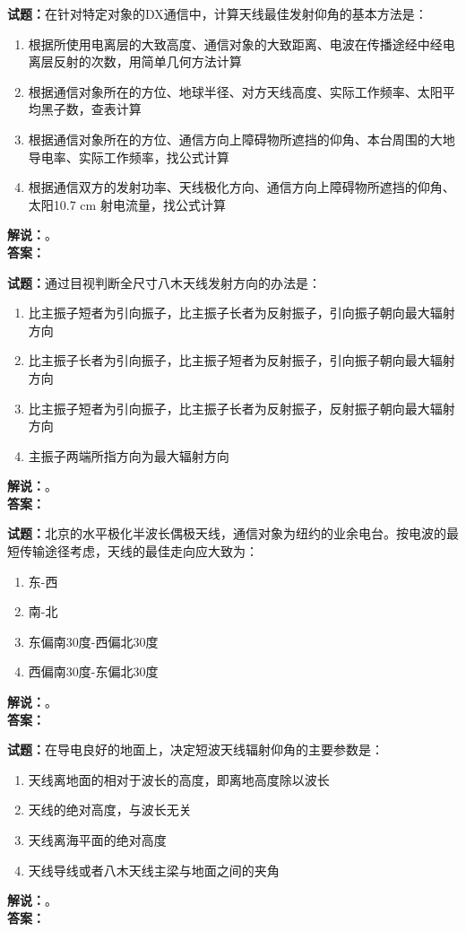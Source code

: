 \documentclass{ctexbook}
\begin{document}
\bigskip

\noindent\textbf{试题：}在针对特定对象的DX通信中，计算天线最佳发射仰角的基本方法是：
\begin{enumerate}[leftmargin=3em]
  \item 根据所使用电离层的大致高度、通信对象的大致距离、电波在传播途经中经电离层反射的次数，用简单几何方法计算
  \item 根据通信对象所在的方位、地球半径、对方天线高度、实际工作频率、太阳平均黑子数，查表计算
  \item 根据通信对象所在的方位、通信方向上障碍物所遮挡的仰角、本台周围的大地导电率、实际工作频率，找公式计算
  \item 根据通信双方的发射功率、天线极化方向、通信方向上障碍物所遮挡的仰角、太阳10.7 cm 射电流量，找公式计算
\end{enumerate}
\noindent\textbf{解说：}\textbf{}。\\\noindent\textbf{答案：}

\bigskip

\noindent\textbf{试题：}通过目视判断全尺寸八木天线发射方向的办法是：
\begin{enumerate}[leftmargin=3em]
  \item 比主振子短者为引向振子，比主振子长者为反射振子，引向振子朝向最大辐射方向
  \item 比主振子长者为引向振子，比主振子短者为反射振子，引向振子朝向最大辐射方向
  \item 比主振子短者为引向振子，比主振子长者为反射振子，反射振子朝向最大辐射方向
  \item 主振子两端所指方向为最大辐射方向
\end{enumerate}
\noindent\textbf{解说：}\textbf{}。\\\noindent\textbf{答案：}

\bigskip

\noindent\textbf{试题：}北京的水平极化半波长偶极天线，通信对象为纽约的业余电台。按电波的最短传输途径考虑，天线的最佳走向应大致为：
\begin{enumerate}[leftmargin=3em]
  \item 东-西
  \item 南-北
  \item 东偏南30度-西偏北30度
  \item 西偏南30度-东偏北30度
\end{enumerate}
\noindent\textbf{解说：}\textbf{}。\\\noindent\textbf{答案：}

\bigskip

\noindent\textbf{试题：}在导电良好的地面上，决定短波天线辐射仰角的主要参数是：
\begin{enumerate}[leftmargin=3em]
  \item 天线离地面的相对于波长的高度，即离地高度除以波长
  \item 天线的绝对高度，与波长无关
  \item 天线离海平面的绝对高度
  \item 天线导线或者八木天线主梁与地面之间的夹角
\end{enumerate}
\noindent\textbf{解说：}\textbf{}。\\\noindent\textbf{答案：}
\end{document}
